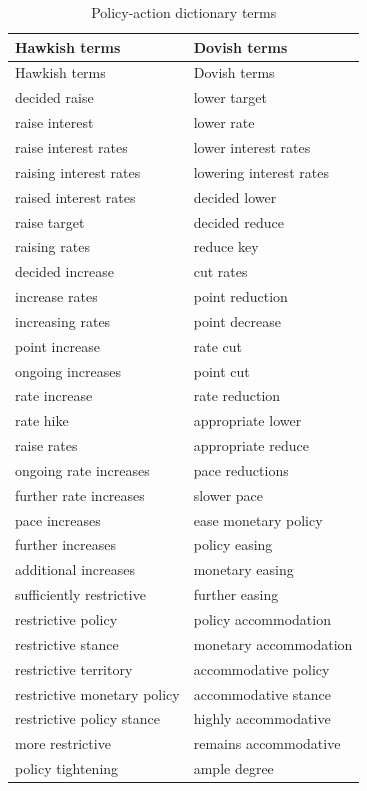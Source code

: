 \begin{longtable}{p{}p{}}
\caption{Policy-action dictionary terms}\label{tab:a1_policy_terms}\\
\toprule
Hawkish terms & Dovish terms \\
\midrule
\endfirsthead
\toprule
Hawkish terms & Dovish terms \\
\midrule
\endhead
decided raise & lower target \\
raise interest & lower rate \\
raise interest rates & lower interest rates \\
raising interest rates & lowering interest rates \\
raised interest rates & decided lower \\
raise target & decided reduce \\
raising rates & reduce key \\
decided increase & cut rates \\
increase rates & point reduction \\
increasing rates & point decrease \\
point increase & rate cut \\
ongoing increases & point cut \\
rate increase & rate reduction \\
rate hike & appropriate lower \\
raise rates & appropriate reduce \\
ongoing rate increases & pace reductions \\
further rate increases & slower pace \\
pace increases & ease monetary policy \\
further increases & policy easing \\
additional increases & monetary easing \\
sufficiently restrictive & further easing \\
restrictive policy & policy accommodation \\
restrictive stance & monetary accommodation \\
restrictive territory & accommodative policy \\
restrictive monetary policy & accommodative stance \\
restrictive policy stance & highly accommodative \\
more restrictive & remains accommodative \\
policy tightening & ample degree \\

\end{longtable}
